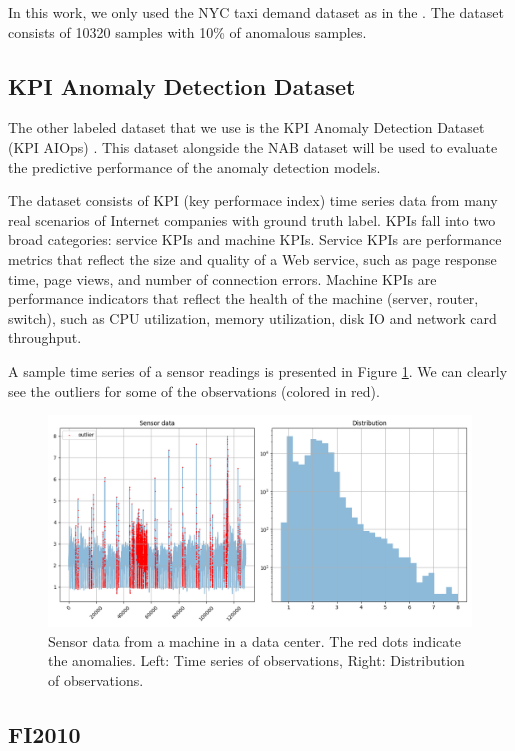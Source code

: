 \documentclass[a4paper, twoside]{report}
\theoremstyle{definition}
\numberwithin{equation}{section}
\begin{document}
In this work, we only used the NYC taxi demand dataset as in the \cite{tuli2022tranad}.
The dataset consists of 10320 samples with 10\% of anomalous samples.

\subsection{KPI Anomaly Detection Dataset}

The other labeled dataset that we use is the KPI Anomaly Detection Dataset (KPI AIOps) \cite{2208.03938}.
This dataset alongside the NAB dataset will be used to evaluate the predictive performance of the anomaly detection models.

The dataset consists of KPI (key performace index) time series data from many
real scenarios of Internet companies with ground truth label. KPIs fall into two
broad categories: service KPIs and machine KPIs. Service KPIs are performance metrics
that reflect the size and quality of a Web service, such as page response time, page views,
and number of connection errors. Machine KPIs are performance indicators that reflect
the health of the machine (server, router, switch), such as CPU utilization, memory utilization,
disk IO and network card throughput.

A sample time series of a sensor readings is presented in Figure \ref{fig:KPIAIOps_example}.
We can clearly see the outliers for some of the observations (colored in red).
\begin{figure}[h!]
    \centering
    \includegraphics[width=\textwidth]{KPIAIOps_example.png}
    \caption{Sensor data from a machine in a data center. The red dots indicate the anomalies. Left: Time series of observations, Right: Distribution of observations.}
    \label{fig:KPIAIOps_example}
\end{figure}

\subsection{FI2010}
\end{document}
